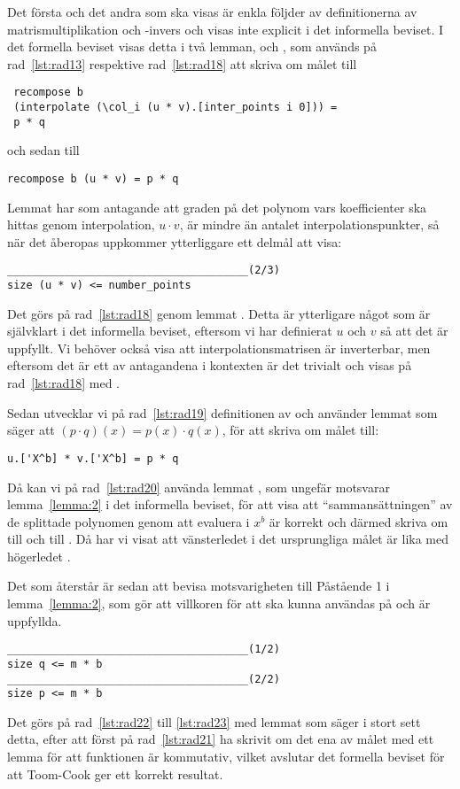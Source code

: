 Det första och det andra som ska visas är enkla följder av definitionerna av
matrismultiplikation och -invers och visas inte explicit i det informella
beviset. I det formella beviset visas detta i två lemman, 
och , som används på rad~\ref{lst:rad13} respektive
rad~\ref{lst:rad18} att skriva om målet till
\begin{lstlisting}
 recompose b
 (interpolate (\col_i (u * v).[inter_points i 0])) =
 p * q
\end{lstlisting}
och sedan till
\begin{lstlisting}
recompose b (u * v) = p * q
\end{lstlisting}
Lemmat  har som antagande att graden på det polynom vars
koefficienter ska hittas genom interpolation, $u \cdot v$, är mindre än antalet
interpolationspunkter, så när det åberopas uppkommer ytterliggare ett delmål
att visa:
\begin{lstlisting}
______________________________________(2/3)
size (u * v) <= number_points
\end{lstlisting}
Det görs på rad~\ref{lst:rad18} genom lemmat . Detta är
ytterligare något som är självklart i det informella beviset, eftersom vi har
definierat $u$ och $v$ så att det är uppfyllt. Vi behöver också visa att
interpolationsmatrisen  är inverterbar, men eftersom det är ett av
antagandena i kontexten är det trivialt och visas på rad~\ref{lst:rad18} med
\C{//}.

Sedan utvecklar vi på rad~\ref{lst:rad19} definitionen av  och använder
lemmat  som säger att $(p \cdot q)(x) = p(x) \cdot q(x)$, för att
skriva om målet till:
\begin{lstlisting}
u.['X^b] * v.['X^b] = p * q
\end{lstlisting}
Då kan vi på rad~\ref{lst:rad20} använda lemmat , som ungefär
motsvarar lemma~\ref{lemma:2} i det informella beviset, för att visa att
``sammansättningen'' av de splittade polynomen genom att evaluera i $x^b$ är
korrekt och därmed skriva om  till  och  till
. Då har vi visat att vänsterledet i det ursprungliga målet är lika med
högerledet .

Det som återstår är sedan att bevisa motsvarigheten till Påstående 1 i
lemma~\ref{lemma:2}, som gör att villkoren för att  ska
kunna användas på  och  är uppfyllda.
\begin{lstlisting}
______________________________________(1/2)
size q <= m * b
______________________________________(2/2)
size p <= m * b
\end{lstlisting}
Det görs på rad~\ref{lst:rad22} till \ref{lst:rad23} med lemmat
 som säger i stort sett detta, efter att först på
rad~\ref{lst:rad21} ha skrivit om det ena av målet med ett lemma för att
funktionen  är kommutativ, vilket avslutar det formella beviset för
att Toom-Cook ger ett korrekt resultat.

